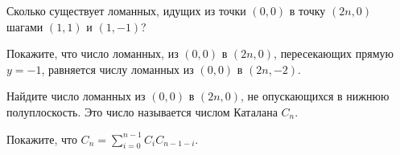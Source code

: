 \begin{enumcyr}
    \item Сколько существует ломанных, идущих из точки $(0, 0)$ в точку $(2n, 0)$ шагами $(1, 1)$ и $(1, -1)$?
    \item Покажите, что число ломанных, из $(0, 0)$ в $(2n, 0)$, пересекающих прямую $y = -1$, равняется числу ломанных из
	    $(0, 0)$ в $(2n, -2)$.
    \item Найдите число ломанных из $(0, 0)$ в $(2n, 0)$, не опускающихся в нижнюю полуплоскость. Это число называется числом
	    Каталана $C_n$.
    \item Покажите, что $C_n = \sum\limits_{i = 0}^{n - 1} C_i C_{n - 1 - i}$.
\end{enumcyr}